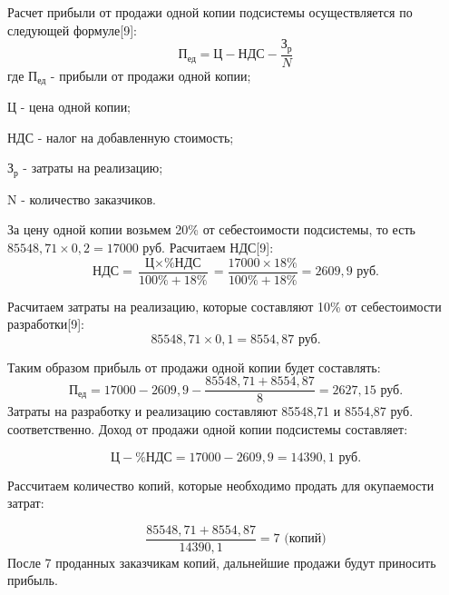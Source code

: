 \documentclass[a4paper]{extarticle}
\numberwithin{equation}{section}
\begin{document}
Расчет прибыли от продажи одной копии подсистемы осуществляется по следующей формуле[9]:
\begin{equation}
\label{form13}
	\text{П}_\text{ед}=\text{Ц}-\text{НДС}-\frac{\text{З}_\text{р}}{N}
\end{equation}
где $\text{П}_\text{ед}$ - прибыли от продажи одной копии;\par
$\text{Ц}$ - цена одной копии;\par
$\text{НДС}$ - налог на добавленную стоимость;\par
$\text{З}_\text{р}$ - затраты на реализацию;\par
N - количество заказчиков.\par
За цену одной копии возьмем 20\% от себестоимости подсистемы, то есть $85548,71\times 0,2 = 17000$ руб.
Расчитаем НДС[9]:
\begin{equation}
\label{form14}
	\text{НДС}=\frac{\text{Ц}\times \text{\%НДС}}{100\%+18\%}=\frac{17000\times 18\%}{100\%+18\%}=2609,9 \text{ руб.}
\end{equation}\par
Расчитаем затраты на реализацию, которые составляют 10\% от себестоимости разработки[9]:
\begin{equation}
\label{form15}
	85548,71\times 0,1 = 8554,87 \text{ руб.}
\end{equation}\par
Таким образом прибыль от продажи одной копии будет составлять:
\begin{equation}
\label{form16}
	\text{П}_\text{ед}=17000-2609,9-\frac{85548,71+8554,87}{8}=2627,15\text{ руб.}
\end{equation}
Затраты на разработку и реализацию составляют 85548,71 и 8554,87 руб. соответственно. Доход от продажи одной копии подсистемы составляет:\par
\begin{equation}
\label{form17}
	\text{Ц}-\text{\%НДС} = 17000-2609,9 = 14390,1 \text{ руб.}
\end{equation}\par
Рассчитаем количество копий, которые необходимо продать для окупаемости затрат:\par
\begin{equation}
\label{form18}
	\frac{85548,71+8554,87}{14390,1}=7 \text{ (копий)}
\end{equation}
После 7 проданных заказчикам копий, дальнейшие продажи будут приносить прибыль.
\end{document}

